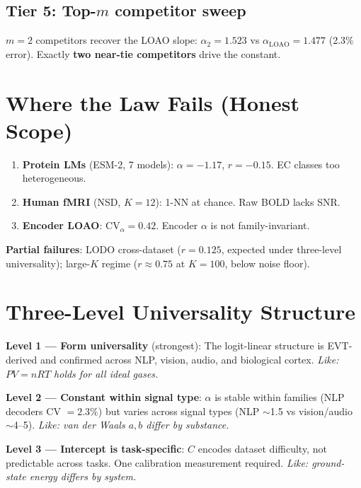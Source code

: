 \documentclass[11pt,a4paper]{article}
\begin{document}
\subsection{Tier 5: Top-$m$ competitor sweep}

$m{=}2$ competitors recover the LOAO slope: $\alpha_2 = 1.523$ vs $\alpha_\mathrm{LOAO} = 1.477$ (2.3\% error). Exactly \textbf{two near-tie competitors} drive the constant.

\section{Where the Law Fails (Honest Scope)}

\begin{warnbox}
\begin{enumerate}[nosep]
\item \textbf{Protein LMs} (ESM-2, 7 models): $\alpha = -1.17$, $r = -0.15$. EC classes too heterogeneous.
\item \textbf{Human fMRI} (NSD, $K{=}12$): 1-NN at chance. Raw BOLD lacks SNR.
\item \textbf{Encoder LOAO}: $\mathrm{CV}_\alpha = 0.42$. Encoder $\alpha$ is not family-invariant.
\end{enumerate}
\end{warnbox}

\textbf{Partial failures}: LODO cross-dataset ($r = 0.125$, expected under three-level universality); large-$K$ regime ($r \approx 0.75$ at $K{=}100$, below noise floor).

\section{Three-Level Universality Structure}

\begin{keybox}
\textbf{Level 1 --- Form universality} (strongest): The logit-linear structure is EVT-derived and confirmed across NLP, vision, audio, and biological cortex. \emph{Like: $PV = nRT$ holds for all ideal gases.}

\textbf{Level 2 --- Constant within signal type}: $\alpha$ is stable within families (NLP decoders CV $= 2.3\%$) but varies across signal types (NLP $\sim$1.5 vs vision/audio $\sim$4--5). \emph{Like: van der Waals $a,b$ differ by substance.}

\textbf{Level 3 --- Intercept is task-specific}: $C$ encodes dataset difficulty, not predictable across tasks. One calibration measurement required. \emph{Like: ground-state energy differs by system.}
\end{keybox}
\end{document}
